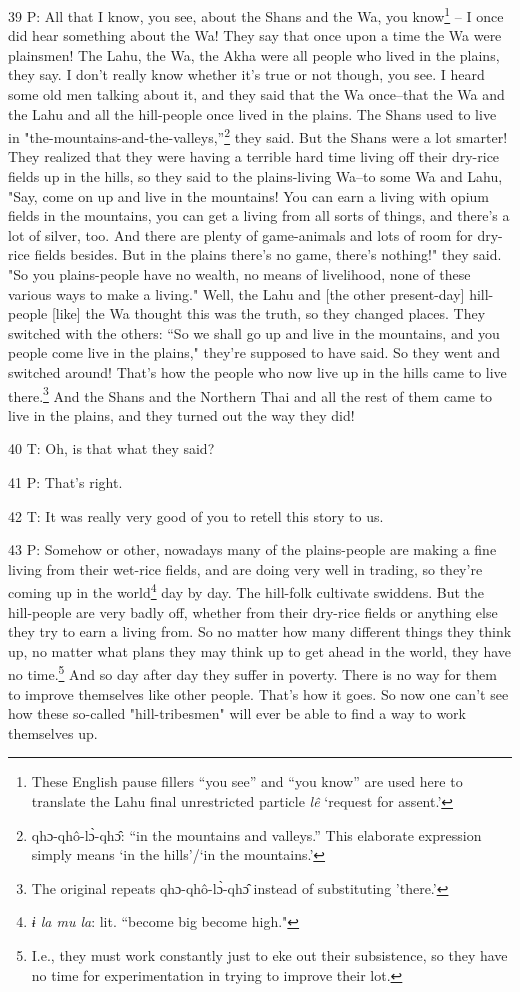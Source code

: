 39 P: All that I know, you see, about the Shans and the Wa, you know\footnote{These English pause fillers ``you see'' and ``you know'' are used here to translate the Lahu final unrestricted particle \textit{lê }`request for assent.'} -- I once
did hear something about the Wa! They say that once upon a time the Wa were plainsmen!
The Lahu, the Wa, the Akha were all people who lived in the plains, they say. I
don't really know whether it's true or not though, you see. I heard some old men
talking about it, and they said that the Wa once--that the Wa and the Lahu and
all the hill-people once lived in the plains. The Shans used to live in "the-mountains-and-the-valleys,''\footnote{qhɔ-qhô-lɔ̀-qhɔ̂: ``in the mountains and valleys.'' This elaborate expression simply means `in the hills'/`in the mountains.'}
they said. But the Shans were a lot smarter! They realized that they were having
a terrible hard time living off their dry-rice fields up in the hills, so they
said to the plains-living Wa--to some Wa and Lahu, "Say, come on up and
live in the mountains! You can earn a living with opium fields in the mountains,
you can get a living from all sorts of things, and there's a lot of silver, too.
And there are plenty of game-animals and lots of room for dry-rice fields besides.
But in the plains there's no game, there's nothing!" they said. "So
you plains-people have no wealth, no means of livelihood, none of these various
ways to make a living." Well, the Lahu and [the other present-day] hill-people
[like] the Wa thought this was the truth, so they changed places. They switched
with the others: ``So we shall go up and live in the mountains, and you people
come live in the plains," they're supposed to have said. So they went
and switched around! That's how the people who now live up in the hills came to
live there.\footnote{The original repeats qhɔ-qhô-lɔ̀-qhɔ̂ instead of substituting 'there.'} And the Shans and the Northern Thai and all the rest of them came
to live in the plains, and they turned out the way they did!

40 T: Oh, is that what they said?

41 P: That's right.

42 T: It was really very good of you to retell this story to us.

43 P: Somehow or other, nowadays many of the plains-people are making a fine living
from their wet-rice fields, and are doing very well in trading, so they're coming
up in the world\footnote{\textit{ɨ la mu la}: lit. ``become big become high."} day by day. The hill-folk cultivate swiddens. But the hill-people
are very badly off, whether from their dry-rice fields or anything else they try
to earn a living from. So no matter how many different things they think up, no
matter what plans they may think up to get ahead in the world, they have no time.\footnote{I.e., they must work constantly just to eke out their subsistence, so they have no time for experimentation in trying to improve their lot.}
And so day after day they suffer in poverty. There is no way for them to improve
themselves like other people. That's how it goes. So now one can't see how these
so-called "hill-tribesmen" will ever be able to find a way to
work themselves up.


